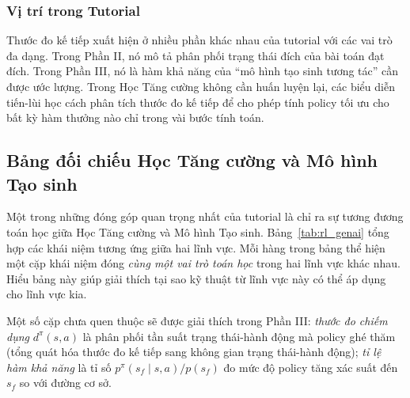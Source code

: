 \subsubsection{Vị trí trong Tutorial}
 
Thước đo kế tiếp xuất hiện ở nhiều phần khác nhau của tutorial với
các vai trò đa dạng. Trong Phần II, nó mô tả phân phối trạng thái đích
của bài toán đạt đích. Trong Phần III, nó là hàm khả năng của
``mô hình tạo sinh tương tác'' cần được ước lượng. Trong Học Tăng cường không cần huấn luyện lại,
các biểu diễn tiến-lùi học cách phân tích thước đo kế tiếp để cho phép tính policy tối ưu cho bất kỳ hàm thưởng nào
chỉ trong vài bước tính toán.
 
\subsection{Bảng đối chiếu Học Tăng cường và Mô hình Tạo sinh}
 
Một trong những đóng góp quan trọng nhất của tutorial là chỉ ra sự
tương đương toán học giữa Học Tăng cường và Mô hình Tạo sinh. Bảng~\ref{tab:rl_genai}
tổng hợp các khái niệm tương ứng giữa hai lĩnh vực. Mỗi hàng trong
bảng thể hiện một cặp khái niệm đóng \textit{cùng một vai trò toán
học} trong hai lĩnh vực khác nhau. Hiểu bảng này giúp giải thích
tại sao kỹ thuật từ lĩnh vực này có thể áp dụng cho lĩnh vực kia.

Một số cặp chưa quen thuộc sẽ được giải thích trong Phần III:
\textit{thước đo chiếm dụng} $d^\pi(s,a)$ là phân phối tần suất
trạng thái-hành động mà policy ghé thăm (tổng quát hóa thước đo kế tiếp sang
không gian trạng thái-hành động); \textit{tỉ lệ hàm khả năng} là tỉ số
$p^\pi(s_f \mid s,a) / p(s_f)$ đo mức độ policy tăng xác suất đến
$s_f$ so với đường cơ sở.
 
